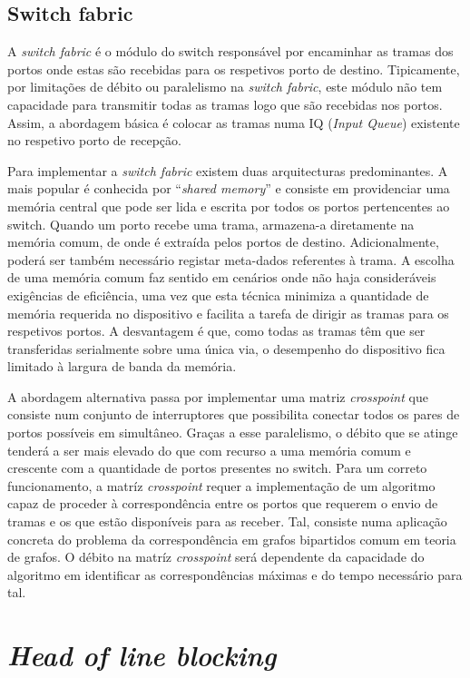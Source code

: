 \subsection{Switch fabric}
A \textit{switch fabric} é o módulo do switch responsável por encaminhar as tramas dos portos onde estas são recebidas para os respetivos porto de destino. Tipicamente, por limitações de débito ou paralelismo na \textit{switch fabric}, este módulo não tem capacidade para transmitir todas as tramas logo que são recebidas nos portos. Assim, a abordagem básica é colocar as tramas numa IQ (\textit{Input Queue}) existente no respetivo porto de recepção.\par 
Para implementar a \textit{switch fabric} existem duas arquitecturas predominantes.
A mais popular é conhecida por “\textit{shared memory}” e consiste em providenciar uma memória central que pode ser lida e escrita por todos os portos pertencentes ao switch. Quando um porto recebe uma trama, armazena-a diretamente na memória comum, de onde é extraída pelos portos de destino. Adicionalmente, poderá ser também necessário registar meta-dados referentes à trama. A escolha de uma memória comum faz sentido em cenários onde não haja consideráveis exigências de eficiência, uma vez que esta técnica minimiza a quantidade de memória requerida no dispositivo e facilita a tarefa de dirigir as tramas para os respetivos portos. A desvantagem é que, como todas as tramas têm que ser transferidas serialmente sobre uma única via, o desempenho do dispositivo fica limitado à largura de banda da memória.\par
A abordagem alternativa passa por implementar uma matriz \textit{crosspoint} que consiste num conjunto de interruptores que possibilita conectar todos os pares de portos possíveis em simultâneo. Graças a esse paralelismo, o débito que se atinge tenderá a ser mais elevado do que com recurso a uma memória comum e crescente com a quantidade de portos presentes no switch. Para um correto funcionamento, a matríz \textit{crosspoint} requer a implementação de um algoritmo capaz de proceder à correspondência entre os portos que requerem o envio de tramas e os que estão disponíveis para as receber. Tal, consiste numa aplicação concreta do problema da correspondência em grafos bipartidos comum em teoria de grafos. O débito na matríz \textit{crosspoint} será dependente da capacidade do algoritmo em identificar as correspondências máximas e do tempo necessário para tal.\par


\section{\textit{Head of line blocking}}


